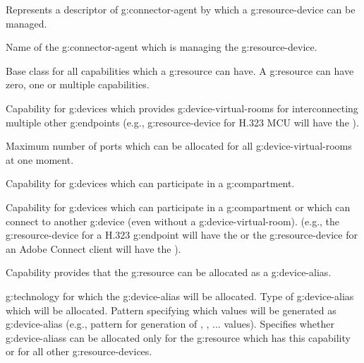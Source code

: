 \begin{Api}
Represents a descriptor of \gls{g:connector-agent} by which a \gls{g:resource-device} can be managed.
\begin{ApiClassAttributes}
 Name of the \gls{g:connector-agent} which is managing the \gls{g:resource-device}.
\end{ApiClassAttributes}

Base class for all capabilities which a \gls{g:resource} can have. A \gls{g:resource} can have zero, one or multiple capabilities.

 Capability for \glspl{g:device} which provides \glspl{g:device-virtual-room} for interconnecting multiple other \glspl{g:endpoint} (e.g., \gls{g:resource-device} for H.323 MCU will have the ).
\begin{ApiClassAttributes}
 Maximum number of ports which can be allocated for all \glspl{g:device-virtual-room} at one moment.
\end{ApiClassAttributes}

 Capability for \glspl{g:device} which can participate in a \gls{g:compartment}.

 Capability for \glspl{g:device} which can participate in a \gls{g:compartment} or which can connect to another \gls{g:device} (even without a \gls{g:device-virtual-room}).
(e.g., the \gls{g:resource-device} for a H.323 \gls{g:endpoint} will have the  or the \gls{g:resource-device} for an Adobe Connect client will have the ).

 Capability provides that the \gls{g:resource} can be allocated as a \gls{g:device-alias}.
\begin{ApiClassAttributes}
 \Gls{g:technology} for which the \gls{g:device-alias} will be allocated.
 Type of \gls{g:device-alias} which will be allocated.
 Pattern specifying which values will be generated as \gls{g:device-alias} (e.g.,  pattern for generation of , , ...  values). 
 Specifies whether \glspl{g:device-alias} can be allocated only for the \gls{g:resource} which has this capability or for all other \glspl{g:resource-device}.
\end{ApiClassAttributes}


\end{Api}
